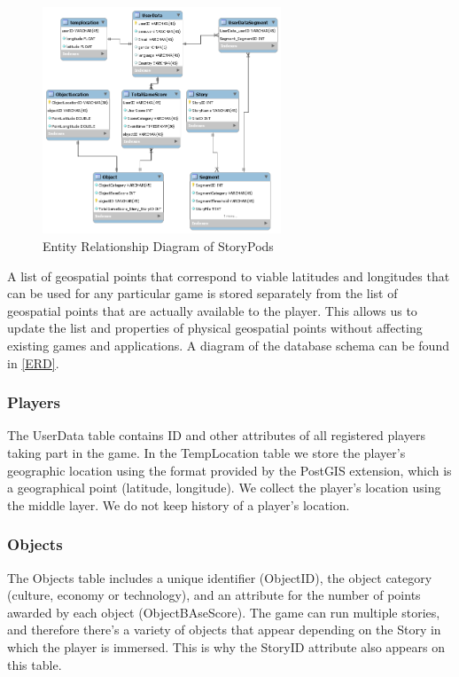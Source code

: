 \documentclass[conference]{IEEEtran}
\begin{document}
\begin{figure}[h]
\centering
\includegraphics[width=2.8in]{imgs/DatabaseSchema.png}
\caption{Entity Relationship Diagram of StoryPods}
\label{ERD}
\end{figure}

A list of geospatial points that correspond to viable latitudes and longitudes that can be used for any particular game is stored separately from the list of geospatial points that are actually available to the player. This allows us to update the list and properties of physical geospatial points without affecting existing games and applications. A diagram of the database schema can be found in \autoref{ERD}. 

\subsubsection*{Players}
The UserData table contains ID and other attributes of all registered players taking part in the game. In the TempLocation table we store the player’s geographic location using the format provided by the PostGIS extension, which is a geographical point (latitude, longitude). We collect the player's location using the middle layer. We do not keep history of a player’s location.

\subsubsection*{Objects}
The Objects table includes a unique identifier (ObjectID), the object category (culture, economy or technology), and an attribute for the number of points awarded by each object (ObjectBAseScore). The game can run multiple stories, and therefore there’s a variety of objects that appear depending on the Story in which the player is immersed. This is why the StoryID attribute also appears on this table. 
\end{document}
